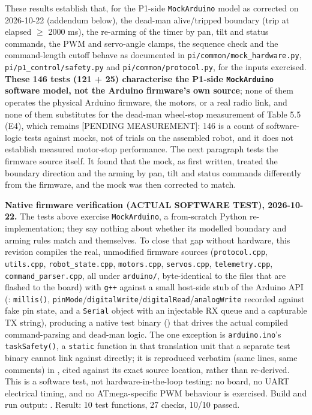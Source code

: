 These results establish that, for the P1-side \texttt{MockArduino} model as corrected on 2026-10-22 (addendum below), the dead-man alive/tripped boundary (trip at elapsed $\geq$ 2000 ms), the re-arming of the timer by pan, tilt and status commands, the PWM and servo-angle clamps, the sequence check and the command-length cutoff behave as documented in \texttt{pi/common/mock\_hardware.py}, \texttt{pi/p1\_control/safety.py} and \texttt{pi/common/protocol.py}, for the inputs exercised. \textbf{These 146 tests (121 + 25) characterise the P1-side \texttt{MockArduino} software model, not the Arduino firmware's own source}; none of them operates the physical Arduino firmware, the motors, or a real radio link, and none of them substitutes for the dead-man wheel-stop measurement of Table 5.5 (E4), which remains [PENDING MEASUREMENT]: 146 is a count of software-logic tests against mocks, not of trials on the assembled robot, and it does not establish measured motor-stop performance. The next paragraph tests the firmware source itself. It found that the mock, as first written, treated the boundary direction and the arming by pan, tilt and status commands differently from the firmware, and the mock was then corrected to match.

\textbf{Native firmware verification (ACTUAL SOFTWARE TEST), 2026-10-22.} The tests above exercise \texttt{MockArduino}, a from-scratch Python re-implementation; they say nothing about whether its modelled boundary and arming rules match \texttt{} and \texttt{} themselves. To close that gap without hardware, this revision compiles the real, unmodified firmware sources (\texttt{protocol.cpp}, \texttt{utils.cpp}, \texttt{robot\_state.cpp}, \texttt{motors.cpp}, \texttt{servos.cpp}, \texttt{telemetry.cpp}, \texttt{command\_parser.cpp}, all under \texttt{arduino/}, byte-identical to the files that are flashed to the board) with \texttt{g++} against a small host-side stub of the Arduino API (\texttt{}: \texttt{millis()}, \texttt{pinMode}/\texttt{digitalWrite}/\texttt{digitalRead}/\texttt{analogWrite} recorded against fake pin state, and a \texttt{Serial} object with an injectable RX queue and a capturable TX string), producing a native test binary (\texttt{}) that drives the actual compiled command-parsing and dead-man logic. The one exception is \texttt{arduino.ino}'s \texttt{taskSafety()}, a \texttt{static} function in that translation unit that a separate test binary cannot link against directly; it is reproduced verbatim (same lines, same comments) in \texttt{}, cited against its exact source location, rather than re-derived. This is a software test, not hardware-in-the-loop testing: no board, no UART electrical timing, and no ATmega-specific PWM behaviour is exercised. Build and run output: \texttt{}. Result: 10 test functions, 27 checks, 10/10 passed.

